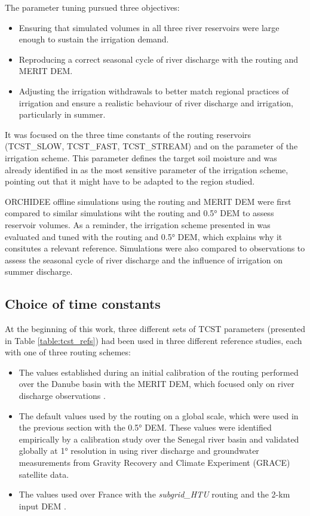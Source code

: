The parameter tuning pursued three objectives:
\begin{itemize}
    \item Ensuring that simulated volumes in all three river reservoirs were large enough to sustain the irrigation demand.
    \item Reproducing a correct seasonal cycle of river discharge with the \native routing and MERIT DEM.
    \item Adjusting the irrigation withdrawals to better match regional practices of irrigation and ensure a realistic behaviour of river discharge and irrigation, particularly in summer.
\end{itemize}

It was focused on the three time constants of the routing reservoirs (TCST\_SLOW, TCST\_FAST, TCST\_STREAM) and on the \betairrig parameter of the irrigation scheme. This parameter defines the target soil moisture and was already identified in \citet{arboleda-obando_validation_2024} as the most sensitive parameter of the irrigation scheme, pointing out that it might have to be adapted to the region studied.  

ORCHIDEE offline simulations using the \native routing and MERIT DEM were first compared to similar simulations wiht the \std routing and 0.5° DEM to assess reservoir volumes. As a reminder, the irrigation scheme presented in \citet{arboleda-obando_validation_2024} was evaluated and tuned with the \std routing and 0.5° DEM, which explains why it consitutes a relevant reference. 
Simulations were also compared to observations to assess the seasonal cycle of river discharge and the influence of irrigation on summer discharge.

\subsection{Choice of time constants}

At the beginning of this work, three different sets of TCST parameters (presented in Table \ref{table:tcst_refs}) had been used in three different reference studies, each with one of three routing schemes:
\begin{itemize}
\item The values established during an initial calibration of the \native routing performed over the Danube basin with the MERIT DEM, which focused only on river discharge observations \citep{kilic_evaluation_2023}.
\item The default values used by the \std routing on a global scale, which were used in the previous section with the 0.5° DEM. These values were identified empirically by a calibration study over the Senegal river basin and validated globally at 1° resolution in \citet{ngo-duc_53-year_2005, ngo-duc_validation_2007} using river discharge and groundwater measurements from Gravity Recovery and Climate Experiment (GRACE) satellite data.
\item The values used over France with the \textit{subgrid\_HTU} routing and the 2-km input DEM \citep{rinchiuso_improving_2022, huang_multi-objective_2024}.
\end{itemize}

